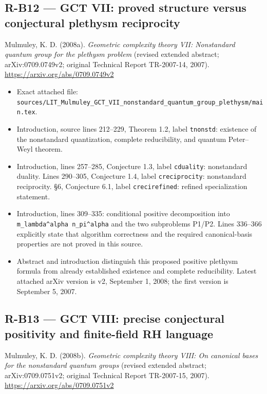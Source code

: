 \documentclass[11pt,a4paper]{article}
\providecommand{\tightlist}{\setlength{\itemsep}{0pt}\setlength{\parskip}{0pt}}
\theoremstyle{definition}\newtheorem{definition}{Definition}
\begin{document}
\subsection{R-B12 --- GCT VII: proved structure versus conjectural
plethysm
reciprocity}\label{r-b12--gct-vii-proved-structure-versus-conjectural-plethysm-reciprocity}

Mulmuley, K. D. (2008a). \emph{Geometric complexity theory VII:
Nonstandard quantum group for the plethysm problem} (revised extended
abstract; arXiv:0709.0749v2; original Technical Report TR-2007-14,
2007). \url{https://arxiv.org/abs/0709.0749v2}

\begin{itemize}
\tightlist
\item
  Exact attached file:
  \nolinkurl{sources/LIT_Mulmuley_GCT_VII_nonstandard_quantum_group_plethysm/main.tex}.
\item
  Introduction, source lines 212--229, Theorem 1.2, label
  \nolinkurl{tnonstd}: existence of the nonstandard quantization, complete
  reducibility, and quantum Peter--Weyl theorem.
\item
  Introduction, lines 257--285, Conjecture 1.3, label \nolinkurl{cduality}:
  nonstandard duality. Lines 290--305, Conjecture 1.4, label
  \nolinkurl{creciprocity}: nonstandard reciprocity. §6, Conjecture 6.1,
  label \nolinkurl{crecirefined}: refined specialization statement.
\item
  Introduction, lines 309--335: conditional positive decomposition into
  \texttt{m\_lambda\^{}alpha\ n\_pi\^{}alpha} and the two subproblems
  P1/P2. Lines 336--366 explicitly state that algorithm correctness and
  the required canonical-basis properties are not proved in this source.
\item
  Abstract and introduction distinguish this proposed positive plethysm
  formula from already established existence and complete reducibility.
  Latest attached arXiv version is v2, September 1, 2008; the first
  version is September 5, 2007.
\end{itemize}

\subsection{R-B13 --- GCT VIII: precise conjectural positivity and
finite-field RH
language}\label{r-b13--gct-viii-precise-conjectural-positivity-and-finite-field-rh-language}

Mulmuley, K. D. (2008b). \emph{Geometric complexity theory VIII: On
canonical bases for the nonstandard quantum groups} (revised extended
abstract; arXiv:0709.0751v2; original Technical Report TR-2007-15,
2007). \url{https://arxiv.org/abs/0709.0751v2}
\end{document}
